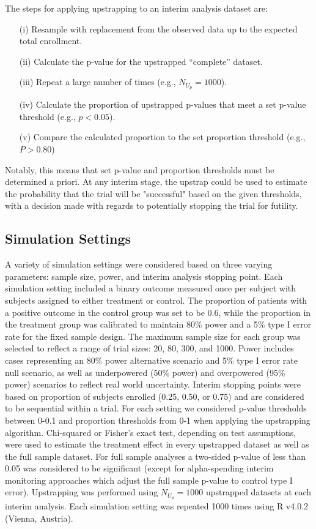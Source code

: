 \documentclass[Afour,sageh,times,square,numbers]{sagej}
\begin{document}
The steps for applying upstrapping to an interim analysis dataset are:
\begin{enumerate}
    \item[(i)] Resample with replacement from the observed data up to the expected total enrollment.
    \item[(ii)] Calculate the p-value for the upstrapped “complete” dataset.
    \item[(iii)] Repeat a large number of times (e.g., $N_{U_p}=1000$).
    \item[(iv)] Calculate the proportion of upstrapped p-values that meet a set p-value threshold (e.g., $p < 0.05$).
    \item[(v)] Compare the calculated proportion to the set proportion threshold (e.g., $P>0.80$)
\end{enumerate}
Notably, this means that set p-value and proportion thresholds must be determined a priori. At any interim stage, the upstrap could be used to estimate the probability that the trial will be "successful" based on the given thresholds, with a decision made with regards to potentially stopping the trial for futility.

\subsection{Simulation Settings}

A variety of simulation settings were considered based on three varying parameters: sample size, power, and interim analysis stopping point. Each simulation setting included a binary outcome measured once per subject with subjects assigned to either treatment or control.  The proportion of patients with a positive outcome in the control group was set to be 0.6, while the proportion in the treatment group was calibrated to maintain 80\% power and a 5\% type I error rate for the fixed sample design.  The maximum sample size for each group was selected to reflect a range of trial sizes: 20, 80, 300, and 1000.  Power includes cases representing an 80\% power alternative scenario and 5\% type I error rate null scenario, as well as underpowered (50\% power) and overpowered (95\% power) scenarios to reflect real world uncertainty. Interim stopping points were based on proportion of subjects enrolled (0.25, 0.50, or 0.75) and are considered to be sequential within a trial.  For each setting we considered p-value thresholds between 0-0.1 and proportion thresholds from 0-1 when applying the upstrapping algorithm. Chi-squared or Fisher’s exact test, depending on test assumptions, were used to estimate the treatment effect in every upstrapped dataset as well as the full sample dataset.  For full sample analyses a two-sided p-value of less than 0.05 was considered to be significant (except for alpha-spending interim monitoring approaches which adjust the full sample p-value to control type I error).  Upstrapping was performed using $N_{U_p}=1000$ upstrapped datasets at each interim analysis.  Each simulation setting was repeated 1000 times using R v4.0.2 (Vienna, Austria).
\end{document}
